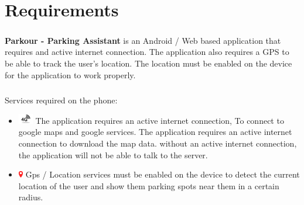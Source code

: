 \chapter{Requirements}

    \paragraph*{}
        \textbf{Parkour - Parking Assistant} is an Android / Web based application that requires and active internet connection. The application also requires a GPS to be able to track the user's location. The location must be enabled on the device for the application to work properly.

        \paragraph*{}
        Services required on the phone:
        \begin{itemize}
            \item \includegraphics*[width=0.05\textwidth]{images/Data.png} The application requires an active internet connection, To connect to google maps and google services. The application requires an active internet connection to download the map data. without an active internet connection, the application will not be able to talk to the server.
            
            \item \includegraphics*[width=0.015\textwidth]{images/gps.png} Gps / Location services must be enabled on the device to detect the current location of the user and show them parking spots near them in a certain radius.
          \end{itemize}